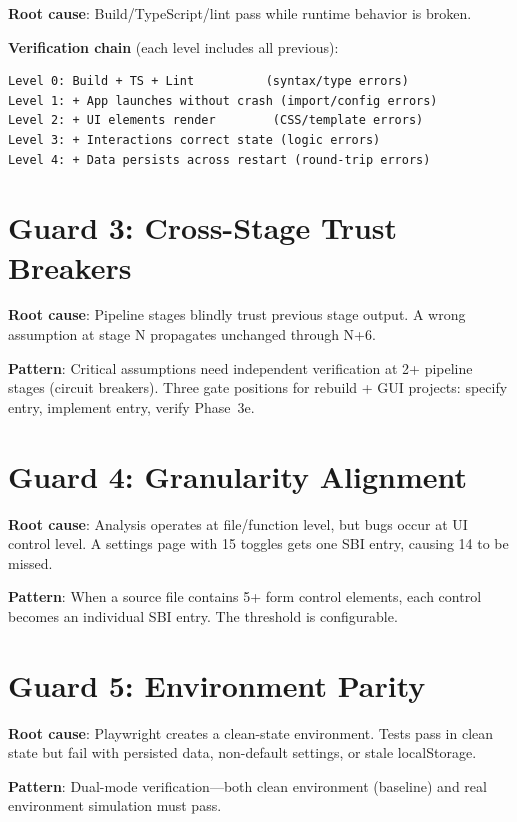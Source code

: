 \documentclass[11pt,a4paper,openright,twoside]{report}
\begin{document}
\textbf{Root cause}: Build/TypeScript/lint pass while runtime behavior is broken.

\textbf{Verification chain} (each level includes all previous):

\begin{lstlisting}[title={Verification Levels}]
Level 0: Build + TS + Lint          (syntax/type errors)
Level 1: + App launches without crash (import/config errors)
Level 2: + UI elements render        (CSS/template errors)
Level 3: + Interactions correct state (logic errors)
Level 4: + Data persists across restart (round-trip errors)
\end{lstlisting}

\section{Guard 3: Cross-Stage Trust Breakers}

\textbf{Root cause}: Pipeline stages blindly trust previous stage output. A wrong assumption at stage N propagates unchanged through N+6.

\textbf{Pattern}: Critical assumptions need independent verification at 2+ pipeline stages (circuit breakers). Three gate positions for rebuild + GUI projects: specify entry, implement entry, verify Phase~3e.

\section{Guard 4: Granularity Alignment}

\textbf{Root cause}: Analysis operates at file/function level, but bugs occur at UI control level. A settings page with 15 toggles gets one SBI entry, causing 14 to be missed.

\textbf{Pattern}: When a source file contains 5+ form control elements, each control becomes an individual SBI entry. The threshold is configurable.

\section{Guard 5: Environment Parity}

\textbf{Root cause}: Playwright creates a clean-state environment. Tests pass in clean state but fail with persisted data, non-default settings, or stale localStorage.

\textbf{Pattern}: Dual-mode verification---both clean environment (baseline) and real environment simulation must pass.
\end{document}
